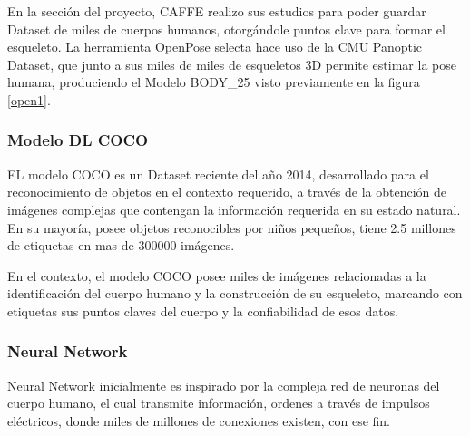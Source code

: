 En la sección del proyecto, CAFFE realizo sus estudios para poder guardar Dataset de miles de cuerpos humanos, otorgándole puntos clave para formar el esqueleto. 
La herramienta OpenPose selecta hace uso de la CMU Panoptic Dataset, que junto a  sus miles de miles de esqueletos 3D permite estimar la pose humana, produciendo el Modelo BODY\_25 visto previamente en la figura \ref{open1}.

\subsubsection{Modelo DL COCO}

EL modelo COCO es un Dataset reciente del año 2014, desarrollado para el reconocimiento de objetos en el contexto requerido, a través de la obtención de imágenes complejas que contengan la información requerida en su estado natural.
En su mayoría, posee objetos reconocibles por niños pequeños, tiene 2.5 millones de etiquetas en mas de 300000 imágenes.

En el contexto, el modelo COCO posee miles de imágenes relacionadas a la identificación del cuerpo humano y la construcción de su esqueleto, marcando con etiquetas sus puntos claves del cuerpo y la confiabilidad de esos datos\cite{lin2014microsoft}.

\subsubsection{Neural Network}

Neural Network inicialmente es inspirado por la compleja red de neuronas del cuerpo humano, el cual transmite información, ordenes a través de impulsos eléctricos, donde miles de millones de conexiones existen, con ese fin\cite{wang2003artificial}. 
\\

